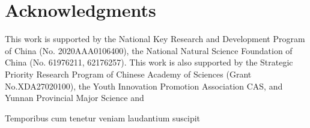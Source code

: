 \documentclass[]{article}
\begin{document}
\section*{Acknowledgments}
This work is supported by the National Key Research and Development Program of China (No. 2020AAA0106400), the National Natural Science Foundation of China (No. 61976211, 62176257). This work is also supported by the Strategic Priority Research Program of Chinese Academy of Sciences (Grant No.XDA27020100), the Youth Innovation Promotion Association CAS, and Yunnan Provincial Major Science and

Temporibus cum tenetur veniam laudantium suscipit

\end{document}
